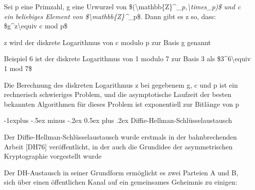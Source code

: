 \documentclass[a4paper]{article}
\makeatletter
\renewcommand{\subsection}{\@startsection{subsection}{2}{0mm}%
 {-1explus -.5ex minus -.2ex}%
 {0.5ex plus .2ex}%
 {\normalfont\normalsize\bfseries}}
\makeatother
\begin{document}
\begin{multicols}{3}
\begin{itemize*}
            \begin{itemize*}
                  \item Sei p eine Primzahl, g eine Urwurzel von \$(\textbackslash mathbb\{Z\}\^{}\emph{\_p,\textbackslash times\_p)\$ und c ein beliebiges Element von \$\textbackslash mathbb\{Z\}\^{}}\_p\$. Dann gibt es z so, dass: \$g\^{}z\textbackslash equiv c mod p\$
                  \item z wird der diskrete Logarithmus von c modulo p zur Basis g genannt
                  \item Beispiel 6 ist der diskrete Logarithmus von 1 modulo 7 zur Basis 3 als \$3\^{}6\textbackslash equiv 1 mod 7\$
                  \item Die Berechnung des diskreten Logarithmus z bei gegebenem g, c und p ist ein rechnerisch schwieriges Problem, und die asymptotische Laufzeit der besten bekannten Algorithmen für dieses Problem ist exponentiell zur Bitlänge von p
            \end{itemize*}
      \end{itemize*}


      \subsection{Diffie-Hellman-Schlüsselaustausch}

      \begin{itemize*}
            \item
            Der Diffie-Hellman-Schlüsselaustausch wurde erstmals in der
            bahnbrechenden Arbeit {[}DH76{]} veröffentlicht, in der auch die
            Grundidee der asymmetrischen Kryptographie vorgestellt wurde
            \item
            Der DH-Austausch in seiner Grundform ermöglicht es zwei Parteien A und
            B, sich über einen öffentlichen Kanal auf ein gemeinsames Geheimnis zu
            einigen:


\end{itemize*}
\end{multicols}
\end{document}
